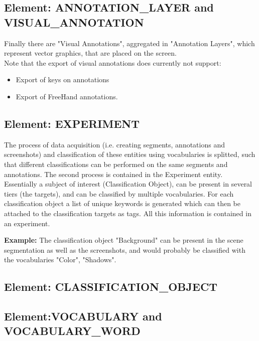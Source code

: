 \documentclass[11pt, a4paper,oneside,chapterprefix=false]{scrbook}
\begin{document}
\newpage
\subsection{Element: ANNOTATION\_LAYER and VISUAL\_ANNOTATION}
Finally there are "Visual Annotations", aggregated in "Annotation Layers", which represent vector graphics, that are placed on the screen. \\

Note that the export of visual annotations does currently not support: 
\begin{itemize}
	\item Export of keys on annotations
	\item Export of FreeHand annotations. 
\end{itemize}


\newpage
\subsection{Element: EXPERIMENT}
The process of data acquisition (i.e. creating segments, annotations and screenshots) and classification of these entities using vocabularies is splitted, such that different classifications can be performed on the same segments and annotations. The second process is contained in the Experiment entity. \\ 
Essentially a subject of interest (Classification Object), can be present in several tiers (the targets), and can be classified by multiple vocabularies. For each classification object a list of unique keywords is generated which can then be attached to the classification targets as tags. All this information is contained in an experiment.\\

\centering
\begin{minipage}{0.8\textwidth}
\textbf{Example:}
	The classification object "Background" can be present in the scene segmentation as well as the screenshots, 
	and would probably be classified with the vocabularies "Color", "Shadows". 
\end{minipage}

\newpage
\subsection{Element: CLASSIFICATION\_OBJECT}


\subsection{Element:VOCABULARY and VOCABULARY\_WORD}

\end{document}
